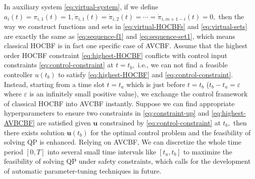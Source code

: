 In auxiliary system \eqref{eq:virtual-system}, if we define $a_{i}(t)=\pi_{i,1}(t)=1, \dot{\pi}_{i,1}(t)=\dot{\pi}_{i,2}(t)=\cdots=\dot{\pi}_{i,m+1-i}(t)=0,$ then the way we construct functions and sets in \eqref{eq:virtual-HOCBFs} and \eqref{eq:virtual-sets} are exactly the same as \eqref{eq:sequence-f1} and \eqref{eq:sequence-set1}, which means classical HOCBF is in fact one specific case of AVCBF. Assume that the highest order HOCBF constraint \eqref{eq:highest-HOCBF} conflicts with control input constraints \eqref{eq:control-constraint} at $t=t_{b},$ i.e., we can not find a feasible controller $u(t_{b})$ to satisfy \eqref{eq:highest-HOCBF} and \eqref{eq:control-constraint}. Instead, starting from a time slot $t=t_{a}$ which is just before $t=t_{b}$ ($t_{b}-t_{a}=\varepsilon$ where $\varepsilon$ is an infinitely small positive value), we exchange the control framework of classical HOCBF into AVCBF instantly. Suppose we can find appropriate hyperparameters to ensure two constraints in \eqref{eq:constraint-up} and \eqref{eq:highest-AVBCBF}
are satisfied given $\boldsymbol{u}$ constrained by \eqref{eq:control-constraint} at $t_{b},$ then there exists solution $\boldsymbol{u}(t_{b})$ for the optimal control problem and the feasibility of solving QP is enhanced. Relying on AVCBF, We can discretize the whole time period $[0,T]$ into several small time intervals like $[t_{a},t_{b}]$ to maximize the feasibility of solving QP under safety constraints, which calls for the development of automatic parameter-tuning techniques in future.
